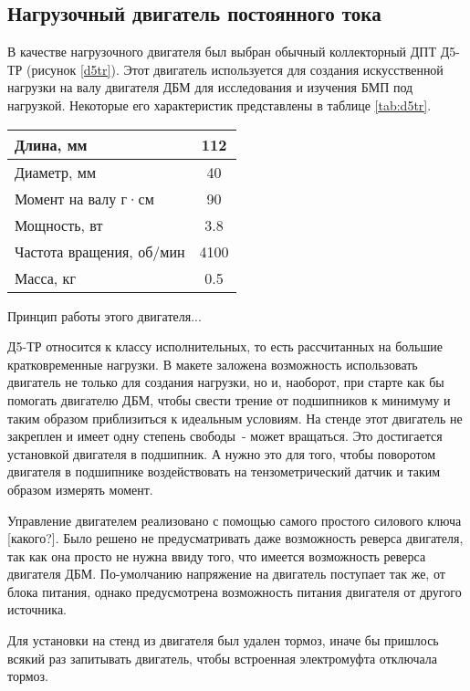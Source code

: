 \subsection{Нагрузочный двигатель постоянного тока}

В качестве нагрузочного двигателя был выбран обычный коллекторный ДПТ Д5-ТР (рисунок \ref{d5tr}). 
Этот двигатель используется для создания искусственной нагрузки на валу 
двигателя ДБМ для исследования и изучения БМП под нагрузкой. Некоторые его характеристик
представлены в таблице \ref{tab:d5tr}.


\begin{tabularx}{\textwidth}{|X|c|}
  \caption{Характеристики двигателя Д5-ТР}\label{tab:d5tr}\\
  \hline
    Длина, мм & 112 \\
  \hline
    Диаметр, мм & 40 \\
  \hline
    Момент на валу г·см & 90 \\
  \hline
    Мощность, вт & 3.8 \\
  \hline
    Частота вращения, об/мин & 4100 \\
  \hline
    Масса, кг & 0.5 \\
  \hline
\end{tabularx}

Принцип работы этого двигателя...

Д5-ТР относится к классу исполнительных, то есть рассчитанных на большие 
кратковременные нагрузки. В макете заложена возможность использовать двигатель не только для
создания нагрузки, но и, наоборот, при старте как бы помогать двигателю ДБМ, чтобы
свести трение от подшипников к минимуму и таким образом приблизиться к идеальным условиям.
На стенде этот двигатель не закреплен и имеет одну степень свободы~- может вращаться. Это
достигается установкой двигателя в подшипник. А нужно это для того, чтобы поворотом двигателя в 
подшипнике воздействовать на тензометрический датчик и таким образом измерять момент.

Управление двигателем реализовано с помощью самого простого силового ключа [какого?].
Было решено не предусматривать даже возможность реверса двигателя, так как она просто не нужна
ввиду того, что имеется возможность реверса двигателя ДБМ. По-умолчанию напряжение на двигатель 
поступает так же, от блока питания, однако предусмотрена возможность питания двигателя от другого 
источника.

Для установки на стенд из двигателя был удален тормоз, иначе бы пришлось всякий раз 
запитывать двигатель, чтобы встроенная электромуфта отключала тормоз.

